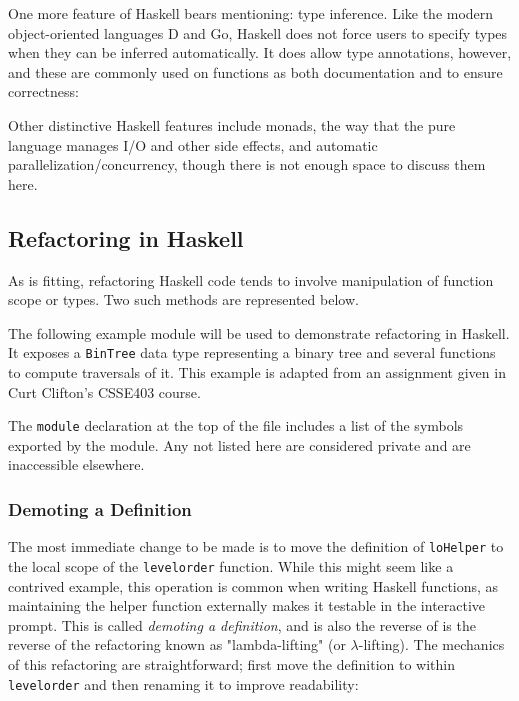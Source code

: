 \documentclass{article}
\begin{document}
One more feature of Haskell bears mentioning: type inference.  Like the modern object-oriented languages D and Go, Haskell does not force users to specify types when they can be inferred automatically.  It does allow type annotations, however, and these are commonly used on functions as both documentation and to ensure correctness:



Other distinctive Haskell features include monads, the way that the pure language manages I/O and other side effects, and automatic parallelization/concurrency, though there is not enough space to discuss them here.

\subsection{Refactoring in Haskell}

As is fitting, refactoring Haskell code tends to involve manipulation of function scope or types.  Two such methods are represented below.

The following example module will be used to demonstrate refactoring in Haskell.  It exposes a \verb!BinTree! data type representing a binary tree and several functions to compute traversals of it.  This example is adapted from an assignment given in Curt Clifton's CSSE403 course\cite{clifton2010}.



The \verb!module! declaration at the top of the file includes a list of the symbols exported by the module.
Any not listed here are considered private and are inaccessible elsewhere.

\subsubsection{Demoting a Definition}

The most immediate change to be made is to move the definition of \verb!loHelper! to the local scope of the \verb!levelorder! function.  
While this might seem like a contrived example, this operation is common when writing Haskell functions, as maintaining the helper function externally makes it testable in the interactive prompt.
This is called \textit{demoting a definition}\cite{li2006refactoring}, and is also the reverse of  is the reverse of the refactoring known as "lambda-lifting" (or $\lambda$-lifting)\cite{haskellwikilifting}.
The mechanics of this refactoring are straightforward; first move the definition to within \verb!levelorder! and then renaming it to improve readability:
\end{document}
